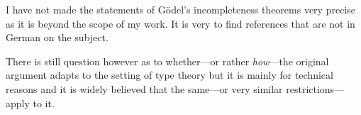 I have not made the statements of Gödel's incompleteness theorems very precise
as it is beyond the scope of my work. It is very to find references that are not
in German on the subject.

There is still question however as to whether---or rather \emph{how}---the
original argument adapts to the setting of type theory but it is mainly for
technical reasons and it is widely believed that the same---or very similar
restrictions---apply to it.